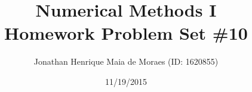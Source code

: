 \title{Numerical Methods I \\ Homework Problem Set \#10}
\author{Jonathan Henrique Maia de Moraes (ID: 1620855)}
\date{11/19/2015}
\maketitle
